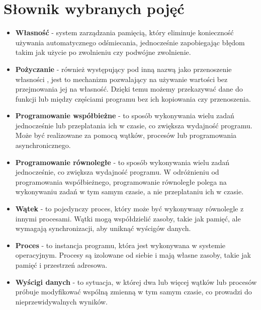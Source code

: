 \newpage
\section{Słownik wybranych pojęć}

\begin{itemize}
    \item \textbf{Własność } - system zarządzania pamięcią, który eliminuje konieczność używania automatycznego odśmiecania, jednocześnie zapobiegając błędom takim jak użycie po zwolnieniu czy podwójne zwolnienie.


    \item \textbf{Pożyczanie } - również występujący pod inną nazwą jako przenoszenie własności \cite{rustPolishNames}, jest to mechanizm pozwalający na używanie wartości bez przejmowania jej na własność. Dzięki temu możemy przekazywać dane do funkcji lub między częściami programu bez ich kopiowania czy przenoszenia.
    
    \item \textbf{Programowanie współbieżne} -  to sposób wykonywania wielu zadań jednocześnie lub przeplatania ich w czasie, co zwiększa wydajność programu. Może być realizowane za pomocą wątków, procesów lub programowania asynchronicznego.
    
    \item \textbf{Programowanie równoległe} - to sposób wykonywania wielu zadań jednocześnie, co zwiększa wydajność programu. W odróżnieniu od programowania współbieżnego, programowanie równoległe polega na wykonywaniu zadań w tym samym czasie, a nie przeplataniu ich w czasie.
    
    \item \textbf{Wątek} - to pojedynczy proces, który może być wykonywany równolegle z innymi procesami. Wątki mogą współdzielić zasoby, takie jak pamięć, ale wymagają synchronizacji, aby uniknąć wyścigów danych.
    \item \textbf{Proces} - to instancja programu, która jest wykonywana w systemie operacyjnym. Procesy są izolowane od siebie i mają własne zasoby, takie jak pamięć i przestrzeń adresowa.
    \item \textbf{Wyścigi danych } - to sytuacja, w której dwa lub więcej wątków lub procesów próbuje modyfikować wspólną zmienną w tym samym czasie, co prowadzi do nieprzewidywalnych wyników.
\end{itemize}